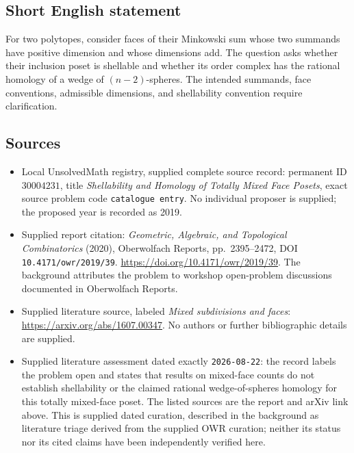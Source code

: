 \documentclass[11pt]{article}
\begin{document}
\subsection{Short English statement}
For two polytopes, consider faces of their Minkowski sum whose two summands have positive dimension and whose dimensions add. The question asks whether their inclusion poset is shellable and whether its order complex has the rational homology of a wedge of \((n-2)\)-spheres. The intended summands, face conventions, admissible dimensions, and shellability convention require clarification.
\subsection{Sources}
\begin{itemize}
\item Local UnsolvedMath registry, supplied complete source record: permanent ID \(30004231\), title \emph{Shellability and Homology of Totally Mixed Face Posets}, exact source problem code \texttt{catalogue entry}. No individual proposer is supplied; the proposed year is recorded as 2019.
\item Supplied report citation: \emph{Geometric, Algebraic, and Topological Combinatorics} (2020), Oberwolfach Reports, pp.~2395--2472, DOI \texttt{10.4171/owr/2019/39}. \url{https://doi.org/10.4171/owr/2019/39}. The background attributes the problem to workshop open-problem discussions documented in Oberwolfach Reports.
\item Supplied literature source, labeled \emph{Mixed subdivisions and faces}: \url{https://arxiv.org/abs/1607.00347}. No authors or further bibliographic details are supplied.
\item Supplied literature assessment dated exactly \texttt{2026-08-22}: the record labels the problem open and states that results on mixed-face counts do not establish shellability or the claimed rational wedge-of-spheres homology for this totally mixed-face poset. The listed sources are the report and arXiv link above. This is supplied dated curation, described in the background as literature triage derived from the supplied OWR curation; neither its status nor its cited claims have been independently verified here.
\end{itemize}
\end{document}
